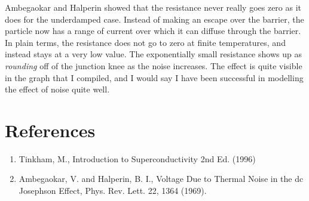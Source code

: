 \documentclass{thesis}
\begin{document}
Ambegaokar and Halperin showed that the resistance never really goes zero as it does for the underdamped case. Instead of making an escape over the barrier, the particle now has a range of current over which it can diffuse through the barrier. In plain terms, the resistance does not go to zero at finite temperatures, and instead stays at a very low value. The exponentially small resistance shows up as \textit{rounding} off of the junction knee as the noise increases. The effect is quite visible in the graph that I compiled, and I would say I have been successful in modelling the effect of noise quite well.

\section{References}
\begin{enumerate}
    \item Tinkham, M., Introduction to Superconductivity 2nd Ed. (1996)
    \item Ambegaokar, V. and Halperin, B. I., Voltage Due to Thermal Noise in the dc Josephson Effect, Phys. Rev. Lett. 22, 1364 (1969).
\end{enumerate}
\end{document}

